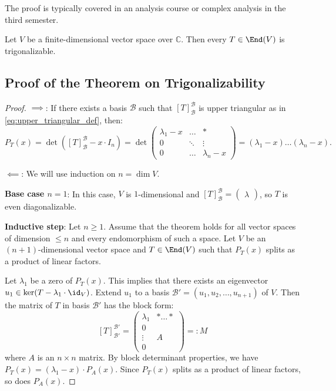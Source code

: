 \begin{remark}\label{rem:fta_proof}
  The proof is typically covered in an analysis course or complex analysis in the third semester.
\end{remark}

\begin{corollary}\label{cor:complex_trigonalizable}
  Let $V$ be a finite-dimensional vector space over $\mathbb{C}$. Then every $T \in \End(V)$ is trigonalizable.
\end{corollary}

\subsection{Proof of the Theorem on Trigonalizability}

\begin{proof}
  $\implies$: If there exists a basis $\mathcal{B}$ such that $[T]_{\mathcal{B}}^{\mathcal{B}}$ is upper triangular as in \eqref{eq:upper_triangular_def}, then:
  \[ P_T(x) = \det([T]_{\mathcal{B}}^{\mathcal{B}} - x \cdot I_n) = \det \begin{pmatrix} \lambda_1 - x & \dots & * \\ 0 & \ddots & \vdots \\ 0 & \dots & \lambda_n - x \end{pmatrix} = (\lambda_1 - x) \dots (\lambda_n - x). \]
  
  \noindent
  $\impliedby$: We will use induction on $n = \dim V$.

  \textbf{Base case $n=1$}: In this case, $V$ is $1$-dimensional and $[T]_{\mathcal{B}}^{\mathcal{B}} = \left(\begin{smallmatrix} \lambda \end{smallmatrix}\right)$, so $T$ is even diagonalizable.

  \textbf{Inductive step}: Let $n \ge 1$. Assume that the theorem holds for all vector spaces of dimension $\le n$ and every endomorphism of such a space.
  Let $V$ be an $(n+1)$-dimensional vector space and $T \in \End(V)$ such that $P_T(x)$ splits as a product of linear factors.

  Let $\lambda_1$ be a zero of $P_T(x)$. This implies that there exists an eigenvector $u_1 \in \ker(T - \lambda_1 \cdot \id_V)$.
  Extend $u_1$ to a basis $\mathcal{B}' = (u_1, u_2, \dots, u_{n+1})$ of $V$.
  Then the matrix of $T$ in basis $\mathcal{B}'$ has the block form:
  \begin{equation} \label{eq:M_block}
    [T]_{\mathcal{B}'}^{\mathcal{B}'} = \left(\begin{array}{c|c} \lambda_1 & * \dots * \\ \hline 0 & \\ \vdots & A \\ 0 & \end{array}\right) =: M
  \end{equation}
  where $A$ is an $n \times n$ matrix.
  By block determinant properties, we have $P_T(x) = (\lambda_1 - x) \cdot P_A(x)$.
  Since $P_T(x)$ splits as a product of linear factors, so does $P_A(x)$.


\end{proof}
